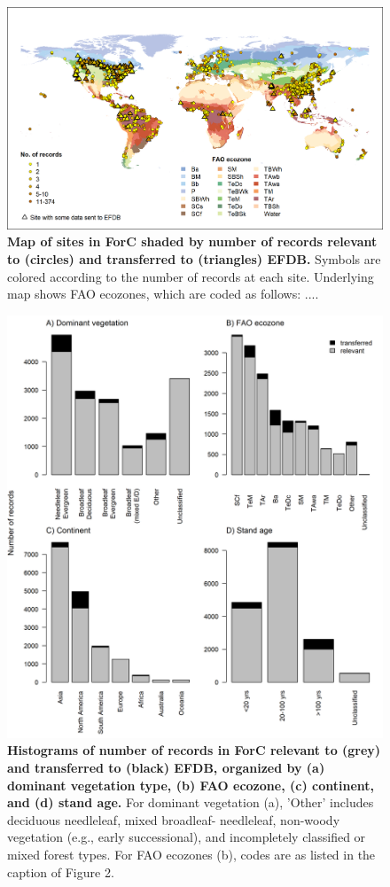 \documentclass[, manuscript]{copernicus}
\begin{document}
\begin{figure}
\includegraphics[width=15cm]{figures_tables/World_Map_of_sites_with_FAO_and_IPCC_data_sent} \caption{\textbf{Map of sites in ForC shaded by number of records relevant to (circles) and transferred to (triangles) EFDB.} Symbols are colored according to the number of records at each site. Underlying map shows FAO ecozones, which are coded as follows: ....}\label{fig:fig_map}
\end{figure}

\begin{figure}
\includegraphics[width=15cm]{figures_tables/Histogram_n_Relevant_and_Transferred_Records} \caption{\textbf{Histograms of number of records in ForC relevant to (grey) and transferred to (black) EFDB, organized by (a) dominant vegetation type, (b) FAO ecozone, (c) continent, and (d) stand age.} For dominant vegetation (a), 'Other' includes deciduous needleleaf, mixed broadleaf- needleleaf, non-woody vegetation (e.g., early successional), and incompletely classified or mixed forest types. For FAO ecozones (b), codes are as listed in the caption of Figure 2.}\label{fig:fig_histograms}
\end{figure}
\end{document}
